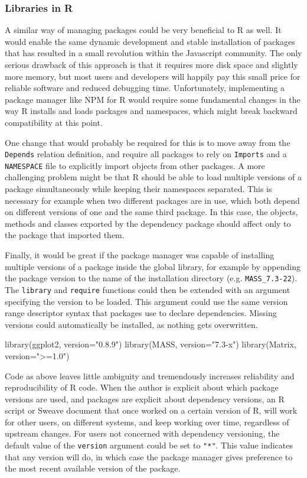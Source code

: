 \subsubsection{Libraries in R}

A similar way of managing packages could be very beneficial to R as well. It would
enable the same dynamic development and stable installation of packages that has
resulted in a small revolution within the Javascript community. The only serious
drawback of this approach is that it requires more disk space and slightly
more memory, but most users and developers will happily pay this small price for
reliable software and reduced debugging time. Unfortunately, implementing a package
manager like NPM for R would require some fundamental changes in the way R installs
and loads packages and namespaces, which might break backward compatibility at this
point.

One change that would probably be required for this is to move away from the
\texttt{Depends} relation definition, and require all packages to rely on
\texttt{Imports} and a \texttt{NAMESPACE} file to explicitly import objects
from other packages. A more challenging problem might be that R should be able
to load multiple versions of a package simultaneously while keeping their
namespaces separated. This is necessary for example when two different packages
are in use, which both depend on different versions of one and the same third
package. In this case, the objects, methods and classes exported by the
dependency package should affect only to the package that imported them.

Finally, it would be great if the package manager was capable of installing
multiple versions of a package inside the global library, for example by appending
the package version to the name of the installation directory (e.g. \texttt{MASS\_7.3-22}).
The \texttt{library} and \texttt{require} functions could then be extended with
an argument specifying the version to be loaded. This argument could use the
same version range descriptor syntax that packages use to declare dependencies.
Missing versions could automatically be installed, as nothing gets overwritten.

\begin{example}
  library(ggplot2, version="0.8.9")
  library(MASS, version="7.3-x")
  library(Matrix, version=">=1.0")
\end{example}

Code as above leaves little ambiguity and tremendously increases reliability
and reproducibility of R code. When the author is explicit about which package
versions are used, and packages are explicit about dependency versions, an R
script or Sweave document that once worked on a certain version of R, will work
for other users, on different systems, and keep working over time, regardless
of upstream changes. For users not concerned with dependency versioning, the
default value of the \texttt{version} argument could be set to \texttt{"*"}.
This value indicates that any version will do, in which case the package
manager gives preference to the most recent available version of the package.

